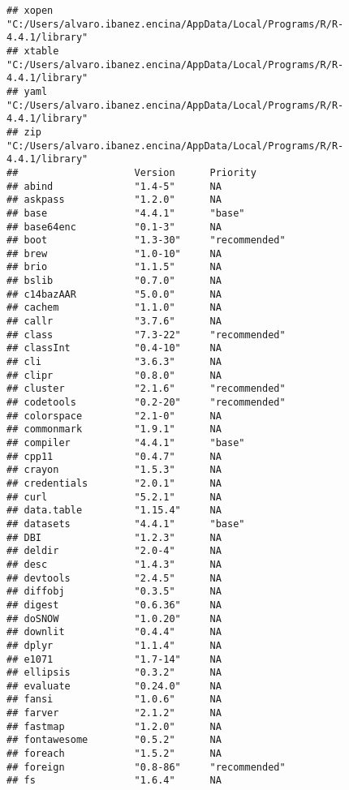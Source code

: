 \documentclass[
]{article}
\begin{document}
\begin{verbatim}
## xopen              "C:/Users/alvaro.ibanez.encina/AppData/Local/Programs/R/R-4.4.1/library"
## xtable             "C:/Users/alvaro.ibanez.encina/AppData/Local/Programs/R/R-4.4.1/library"
## yaml               "C:/Users/alvaro.ibanez.encina/AppData/Local/Programs/R/R-4.4.1/library"
## zip                "C:/Users/alvaro.ibanez.encina/AppData/Local/Programs/R/R-4.4.1/library"
##                    Version      Priority     
## abind              "1.4-5"      NA           
## askpass            "1.2.0"      NA           
## base               "4.4.1"      "base"       
## base64enc          "0.1-3"      NA           
## boot               "1.3-30"     "recommended"
## brew               "1.0-10"     NA           
## brio               "1.1.5"      NA           
## bslib              "0.7.0"      NA           
## c14bazAAR          "5.0.0"      NA           
## cachem             "1.1.0"      NA           
## callr              "3.7.6"      NA           
## class              "7.3-22"     "recommended"
## classInt           "0.4-10"     NA           
## cli                "3.6.3"      NA           
## clipr              "0.8.0"      NA           
## cluster            "2.1.6"      "recommended"
## codetools          "0.2-20"     "recommended"
## colorspace         "2.1-0"      NA           
## commonmark         "1.9.1"      NA           
## compiler           "4.4.1"      "base"       
## cpp11              "0.4.7"      NA           
## crayon             "1.5.3"      NA           
## credentials        "2.0.1"      NA           
## curl               "5.2.1"      NA           
## data.table         "1.15.4"     NA           
## datasets           "4.4.1"      "base"       
## DBI                "1.2.3"      NA           
## deldir             "2.0-4"      NA           
## desc               "1.4.3"      NA           
## devtools           "2.4.5"      NA           
## diffobj            "0.3.5"      NA           
## digest             "0.6.36"     NA           
## doSNOW             "1.0.20"     NA           
## downlit            "0.4.4"      NA           
## dplyr              "1.1.4"      NA           
## e1071              "1.7-14"     NA           
## ellipsis           "0.3.2"      NA           
## evaluate           "0.24.0"     NA           
## fansi              "1.0.6"      NA           
## farver             "2.1.2"      NA           
## fastmap            "1.2.0"      NA           
## fontawesome        "0.5.2"      NA           
## foreach            "1.5.2"      NA           
## foreign            "0.8-86"     "recommended"
## fs                 "1.6.4"      NA           

\end{verbatim}
\end{document}
